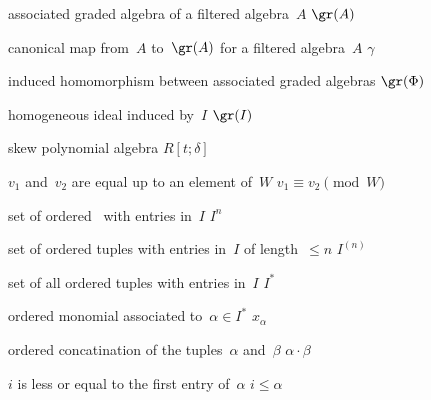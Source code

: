{associated graded algebra of a filtered algebra~$A$}
{$\gr(A)$}

{canonical map from~$A$ to~$\gr(A)$ for a filtered algebra~$A$}
{$\gamma$}

{induced homomorphism between associated graded algebras}
{$\gr(\Phi)$}

{homogeneous ideal induced by~$I$}
{$\gr(I)$}

{skew polynomial algebra}
{$R[t; \delta]$}

{$v_1$ and~$v_2$ are equal up to an element of~$W$}
{$v_1 \equiv v_2 \pmod{W}$}

{set of ordered~ with entries in~$I$}
{$I^n$}

{set of ordered tuples with entries in~$I$ of length~$\leq n$}
{$I^{(n)}$}

{set of all ordered tuples with entries in~$I$}
{$I^*$}

{ordered monomial associated to~$\alpha \in I^*$}
{$x_\alpha$}

{ordered concatination of the tuples~$\alpha$ and~$\beta$}
{$\alpha \cdot \beta$}

{$i$ is less or equal to the first entry of~$\alpha$}
{$i \leq \alpha$}
